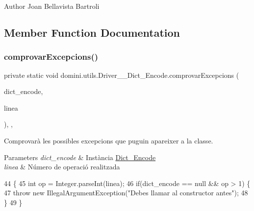 \begin{DoxyAuthor}{Author}
Joan Bellavista Bartroli 
\end{DoxyAuthor}


\subsection{Member Function Documentation}
\mbox{\label{classdomini_1_1utils_1_1Driver____Dict__Encode_ab67e87f26a75c12e50130a5e5facb52e}} 
\subsubsection{\texorpdfstring{comprovar\+Excepcions()}{comprovarExcepcions()}}
{\footnotesize\ttfamily private static void domini.\+utils.\+Driver\+\_\+\+\_\+\+Dict\+\_\+\+Encode.\+comprovar\+Excepcions (\begin{DoxyParamCaption}\item[{\hyperlink{classdomini_1_1utils_1_1Dict__Encode}{Dict\+\_\+\+Encode}}]{dict\+\_\+encode,  }\item[{String}]{linea }\end{DoxyParamCaption})\hspace{0.3cm}{\ttfamily [inline]}, {\ttfamily [static]}, {\ttfamily [private]}}



Comprovarà les possibles excepcions que puguin apareixer a la classe. 


\begin{DoxyParams}{Parameters}
{\em dict\+\_\+encode} & Instància \hyperlink{classdomini_1_1utils_1_1Dict__Encode}{Dict\+\_\+\+Encode} \\
\hline
{\em linea} & Número de operació realitzada \\
\hline
\end{DoxyParams}

\begin{DoxyCode}
44                                                                                   \{
45         \textcolor{keywordtype}{int} op = Integer.parseInt(linea);
46         \textcolor{keywordflow}{if}(dict\_encode == null && op > 1) \{
47             \textcolor{keywordflow}{throw} \textcolor{keyword}{new} IllegalArgumentException(\textcolor{stringliteral}{"Debes llamar al constructor antes"});
48         \}
49     \}
\end{DoxyCode}
\mbox{\label{classdomini_1_1utils_1_1Driver____Dict__Encode_a67a9ab54d3335c433791b823d192ac8f}} 
